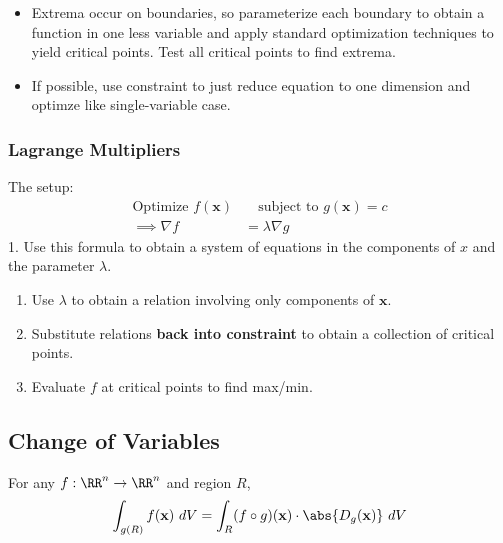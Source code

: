 \begin{itemize}
\tightlist
\item
  Extrema occur on boundaries, so parameterize each boundary to obtain a
  function in one less variable and apply standard optimization
  techniques to yield critical points. Test all critical points to find
  extrema.
\item
  If possible, use constraint to just reduce equation to one dimension
  and optimze like single-variable case.
\end{itemize}


\hypertarget{lagrange-multipliers}{%
\subsubsection{Lagrange Multipliers}\label{lagrange-multipliers}}

The setup:
\begin{align*} 
\text{Optimize } f(\mathbf x) &\quad \text{subject to } g(\mathbf x) = c \\ \implies \nabla f &= \lambda \nabla g
\end{align*} 1. Use this formula to obtain a system of equations in the
components of \(x\) and the parameter \(\lambda\).

\begin{enumerate}
\def\labelenumi{\arabic{enumi}.}
\setcounter{enumi}{1}
\item
  Use \(\lambda\) to obtain a relation involving only components of
  \(\mathbf{x}\).
\item
  Substitute relations \textbf{back into constraint} to obtain a
  collection of critical points.
\item
  Evaluate \(f\) at critical points to find max/min.
\end{enumerate}


\hypertarget{change-of-variables}{%
\subsection{Change of Variables}\label{change-of-variables}}

For any \(f: \RR^n \to \RR^n\) and region \(R\),
\begin{align*}
\int _ { g ( R ) } f ( \mathbf { x } ) ~d V = \int _ { R } (f  \circ g) ( \mathbf { x } )  \cdot \abs{D_g  ( \mathbf { x })} ~d V
\end{align*}

